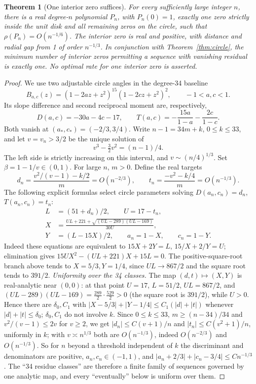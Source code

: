 \documentclass[11pt]{article}
\newtheorem{theorem}{Theorem}
\theoremstyle{remark}\newtheorem{remark}[theorem]{Remark}
\begin{document}
\begin{theorem}[One interior zero suffices]\label{thm:one}
For every sufficiently large integer \(n\), there is a real
degree-\(n\) polynomial \(P_n\), with \(P_n(0)=1\), exactly one
zero strictly inside the unit disk and all remaining zeros on the
circle, such that \(\rho(P_n)=O(n^{-1/6})\).
The interior zero is real and positive, with distance and radial gap
from 1 of order \(n^{-1/3}\). In conjunction with
Theorem~\ref{thm:circle}, the minimum number of interior zeros
permitting a sequence with vanishing residual is exactly one.
No optimal rate for one interior zero is asserted.
\end{theorem}
\begin{proof}
We use two adjustable circle angles in the degree-34 baseline
\[
 B_{a,c}(z)=(1-2az+z^2)^{15}(1-2cz+z^2)^2,
 \qquad -1<a,c<1.
\]
Its slope difference and second reciprocal moment are, respectively,
\[
 D(a,c)=-30a-4c-17,\qquad
 T(a,c)=-\frac{15a}{1-a}-\frac{2c}{1-c}.
\]
Both vanish at \((a_*,c_*)=(-2/3,3/4)\). Write
\(n-1=34m+k\), \(0\le k\le33\), and let \(v=v_n>3/2\)
be the unique solution of
\begin{equation}\label{eq:single-cubic}
 v^3-\tfrac32v^2=(n-1)/4.
\end{equation}
The left side is strictly increasing on this interval, and
\(v\sim(n/4)^{1/3}\). Set \(\beta=1-1/v\in(0,1)\).
For large \(n\), \(m>0\). Define the real targets
\[
 d_n=\frac{v^2/(v-1)-k/2}{m}=O(n^{-2/3}),\qquad
 t_n=\frac{-v^2-k/4}{m}=O(n^{-1/3}).
\]
The following explicit formulas select circle parameters solving
\(D(a_n,c_n)=d_n\), \(T(a_n,c_n)=t_n\):
\begin{align*}
 L&=(51+d_n)/2,\qquad U=17-t_n,\\
 X&=\frac{UL+221+\sqrt{(UL-289)(UL-169)}}{30U},\\
 Y&=(L-15X)/2,\qquad a_n=1-X,\qquad c_n=1-Y.
\end{align*}
Indeed these equations are equivalent to
\(15X+2Y=L\), \(15/X+2/Y=U\); elimination gives
\(15UX^2-(UL+221)X+15L=0\). The positive-square-root branch
above tends to \(X=5/3,Y=1/4\), since
\(UL\to867/2\) and the square root tends to \(391/2\).
\emph{Uniformity over the 34 classes.}
The map \((d,t)\mapsto(X,Y)\) is real-analytic near \((0,0)\): at that
point \(U=17\), \(L=51/2\), \(UL=867/2\), and
\((UL-289)(UL-169)=\tfrac{289}{2}\cdot\tfrac{529}{2}>0\) (the square root
is \(391/2\)), while \(U>0\). Hence there are \(\delta_0,C_1\) with
\(|X-5/3|+|Y-1/4|\le C_1(|d|+|t|)\) whenever \(|d|+|t|\le\delta_0\);
\(\delta_0,C_1\) do not involve \(k\). Since \(0\le k\le33\),
\(m\ge(n-34)/34\) and \(v^2/(v-1)\le2v\) for \(v\ge2\), we get
\(|d_n|\le C(v+1)/n\) and \(|t_n|\le C(v^2+1)/n\), uniformly in \(k\);
with \(v\asymp n^{1/3}\) both are \(O(n^{-1/3})\), indeed
\(O(n^{-2/3})\) and \(O(n^{-1/3})\). So for \(n\) beyond a threshold
independent of \(k\) the discriminant and denominators are positive,
\(a_n,c_n\in(-1,1)\), and
\(|a_n+2/3|+|c_n-3/4|\le Cn^{-1/3}\). The ``34 residue classes'' are
therefore a finite family of sequences governed by one analytic map, and
every ``eventually'' below is uniform over them.


\end{proof}
\end{document}
